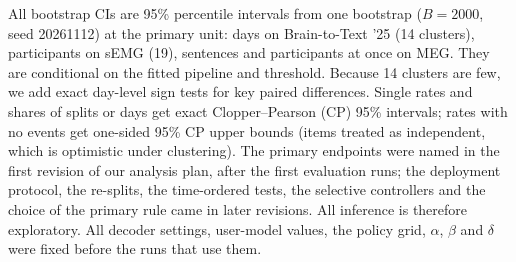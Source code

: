All bootstrap CIs are 95\% percentile intervals from one bootstrap ($B = 2000$, seed 20261112) at the primary unit: days on Brain-to-Text '25 (14 clusters), participants on sEMG (19), sentences and participants at once on MEG. They are conditional on the fitted pipeline and threshold. Because 14 clusters are few, we add exact day-level sign tests for key paired differences. Single rates and shares of splits or days get exact Clopper--Pearson (CP) 95\% intervals; rates with no events get one-sided 95\% CP upper bounds (items treated as independent, which is optimistic under clustering). The primary endpoints were named in the first revision of our analysis plan, after the first evaluation runs; the deployment protocol, the re-splits, the time-ordered tests, the selective controllers and the choice of the primary rule came in later revisions. All inference is therefore exploratory. All decoder settings, user-model values, the policy grid, $\alpha$, $\beta$ and $\delta$ were fixed before the runs that use them.

